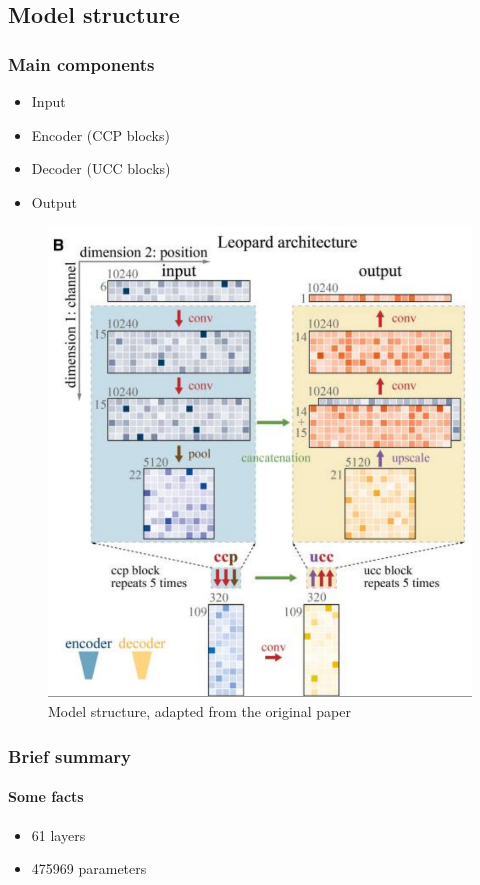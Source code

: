 \documentclass{beamer}
\begin{document}
\subsection{Model structure}

\begin{frame}
    \frametitle{Main components}
    \begin{itemize}
        \item Input
        \item Encoder (CCP blocks)
        \item Decoder (UCC blocks)
        \item Output
    \end{itemize}
\end{frame}

\begin{frame}
    \begin{figure}
        \centering
        \includegraphics[height=0.87\textheight]{model_struct}
        \caption{Model structure, adapted from the original paper}
    \end{figure}
\end{frame}

\begin{frame}
    \frametitle{Brief summary}
    \framesubtitle{Some facts}
    \begin{itemize}
        \item 61 layers
        \item 475969 parameters 
    \end{itemize}
\end{frame}
\end{document}
